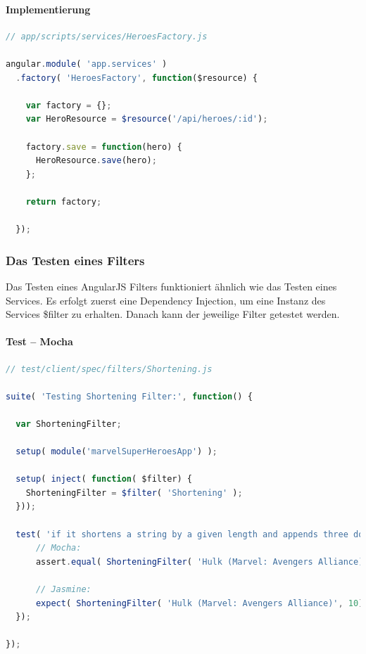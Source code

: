 \paragraph{Implementierung}
\begin{lstlisting}[language=JavaScript, caption=TDD AngularJS - Service - Implementierung]
// app/scripts/services/HeroesFactory.js

angular.module( 'app.services' )
  .factory( 'HeroesFactory', function($resource) {

    var factory = {};
    var HeroResource = $resource('/api/heroes/:id');

    factory.save = function(hero) {
      HeroResource.save(hero);
    };

    return factory;

  });
\end{lstlisting}

\newpage
\subsubsection{Das Testen eines Filters}
Das Testen eines AngularJS Filters funktioniert ähnlich wie das Testen eines Services. Es erfolgt zuerst eine Dependency Injection, um eine Instanz des Services \$filter zu erhalten. Danach kann der jeweilige Filter getestet werden.

\paragraph{Test -- Mocha}
\begin{lstlisting}[language=JavaScript, caption=TDD AngularJS - Filters]
// test/client/spec/filters/Shortening.js

suite( 'Testing Shortening Filter:', function() {

  var ShorteningFilter;

  setup( module('marvelSuperHeroesApp') );

  setup( inject( function( $filter) {
    ShorteningFilter = $filter( 'Shortening' );
  }));

  test( 'if it shortens a string by a given length and appends three dots', function() {
      // Mocha:
      assert.equal( ShorteningFilter( 'Hulk (Marvel: Avengers Alliance)', 10), 'Hulk (Marv...' );

      // Jasmine:
      expect( ShorteningFilter( 'Hulk (Marvel: Avengers Alliance)', 10) ).toEqual( 'Hulk (Marv...' );
  });

});
\end{lstlisting}

